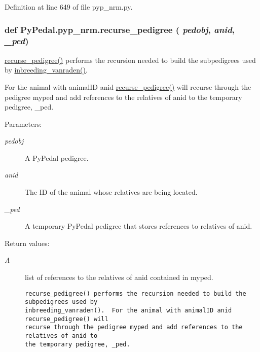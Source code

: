 Definition at line 649 of file pyp\_\-nrm.py.\hypertarget{namespacePyPedal_1_1pyp__nrm_c2e0cc42e37f47162f7844645ebf21e1}{
\subsubsection[recurse\_\-pedigree]{\setlength{\rightskip}{0pt plus 5cm}def Py\-Pedal.pyp\_\-nrm.recurse\_\-pedigree ( {\em pedobj},  {\em anid},  {\em \_\-ped})}}
\label{namespacePyPedal_1_1pyp__nrm_c2e0cc42e37f47162f7844645ebf21e1}


\hyperlink{namespacePyPedal_1_1pyp__nrm_c2e0cc42e37f47162f7844645ebf21e1}{recurse\_\-pedigree()} performs the recursion needed to build the subpedigrees used by \hyperlink{namespacePyPedal_1_1pyp__nrm_577fd15845cca08988029a7ccf7f68e4}{inbreeding\_\-vanraden()}. 

For the animal with animal\-ID anid \hyperlink{namespacePyPedal_1_1pyp__nrm_c2e0cc42e37f47162f7844645ebf21e1}{recurse\_\-pedigree()} will recurse through the pedigree myped and add references to the relatives of anid to the temporary pedigree, \_\-ped. \begin{Desc}
\item[Parameters:]
\begin{description}
\item[{\em pedobj}]A Py\-Pedal pedigree. \item[{\em anid}]The ID of the animal whose relatives are being located. \item[{\em \_\-ped}]A temporary Py\-Pedal pedigree that stores references to relatives of anid. \end{description}
\end{Desc}
\begin{Desc}
\item[Return values:]
\begin{description}
\item[{\em A}]list of references to the relatives of anid contained in myped.

\footnotesize\begin{verbatim}recurse_pedigree() performs the recursion needed to build the subpedigrees used by
inbreeding_vanraden().  For the animal with animalID anid recurse_pedigree() will
recurse through the pedigree myped and add references to the relatives of anid to
the temporary pedigree, _ped.
\end{verbatim}
\normalsize
 \end{description}
\end{Desc}


